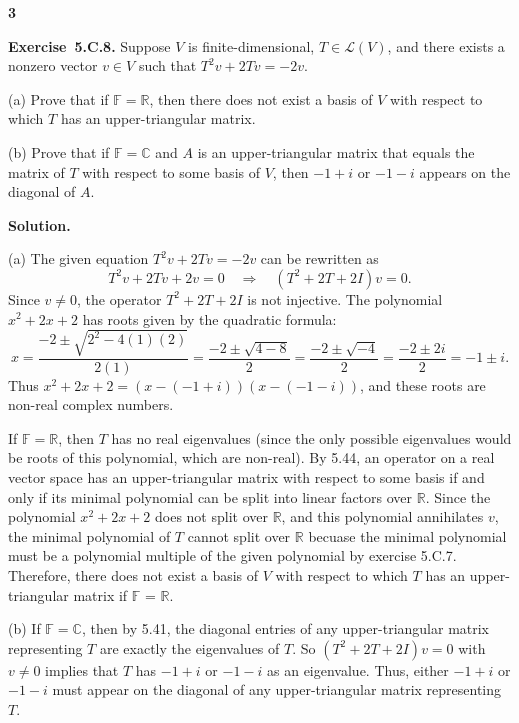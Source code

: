 \documentclass[11pt]{article}
\newcommand{\ProblemDivider}[1]{%
  \vspace{1.0em}
  \noindent\textbf{#1}\par
  \vspace{0.35em}
}
\newcommand{\ProblemAnnounce}{\noindent}
\newcommand{\SolutionAnnounce}{\noindent\textbf{Solution.}\par\medskip}
\newcommand{\Exercise}[1]{\textbf{Exercise~#1.}\;}
\newcommand{\R}{\mathbb{R}}
\newcommand{\C}{\mathbb{C}}
\newcommand{\F}{\mathbb{F}}
\newcommand{\calL}{\mathcal{L}}
\begin{document}
\ProblemDivider{3}

\begin{problemBox}
\ProblemAnnounce
\Exercise{5.C.8}
Suppose $V$ is finite-dimensional, $T \in \calL(V)$, and there exists a nonzero vector $v \in V$ such that $T^2 v + 2Tv = -2v$.

(a) Prove that if $\F = \R$, then there does not exist a basis of $V$ with respect to which $T$ has an upper-triangular matrix.

(b) Prove that if $\F = \C$ and $A$ is an upper-triangular matrix that equals the matrix of $T$ with respect to some basis of $V$, then $-1 + i$ or $-1 - i$ appears on the diagonal of $A$.
\end{problemBox}

\begin{solutionBox}
\SolutionAnnounce
\doublespacing

(a) The given equation $T^2v + 2Tv = -2v$ can be rewritten as
\[
T^2v + 2Tv + 2v = 0 \quad \Longrightarrow \quad (T^2 + 2T + 2I)v = 0.
\]
Since $v \neq 0$, the operator $T^2 + 2T + 2I$ is not injective. The polynomial $x^2 + 2x + 2$ has roots given by the quadratic formula:
\[
x = \frac{-2 \pm \sqrt{2^2 - 4(1)(2)}}{2(1)} = \frac{-2 \pm \sqrt{4-8}}{2} = \frac{-2 \pm \sqrt{-4}}{2} = \frac{-2 \pm 2i}{2} = -1 \pm i.
\]
Thus $x^2 + 2x + 2 = (x - (-1+i))(x - (-1-i))$, and these roots are non-real complex numbers.

If $\F = \R$, then $T$ has no real eigenvalues (since the only possible eigenvalues would be roots of this polynomial, which are non-real). By 5.44, an operator on a real vector space has an upper-triangular matrix with respect to some basis if and only if its minimal polynomial can be split into linear factors over $\R$. Since the polynomial $x^2 + 2x + 2$ does not split over $\R$, and this polynomial annihilates $v$, the minimal polynomial of $T$ cannot split over $\R$ becuase the minimal polynomial must be a polynomial multiple of the given polynomial by exercise 5.C.7. Therefore, there does not exist a basis of $V$ with respect to which $T$ has an upper-triangular matrix if $\F$ = $\R$.

(b) If $\F = \C$, then by 5.41, the diagonal entries of any upper-triangular matrix representing $T$ are exactly the eigenvalues of $T$. So $(T^2 + 2T + 2I)v = 0$ with $v \neq 0$ implies that $T$ has $-1+i$ or $-1-i$ as an eigenvalue. Thus, either $-1+i$ or $-1-i$ must appear on the diagonal of any upper-triangular matrix representing $T$.

\end{solutionBox}
\newpage
\end{document}
